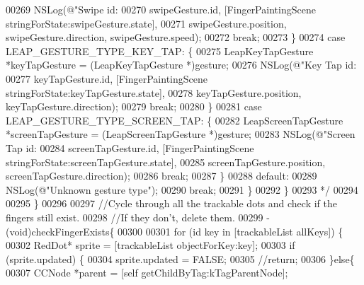 \begin{DoxyCode}
{{{{{{{{{00269 \textcolor{comment}{                NSLog(@"Swipe id: %
00270 \textcolor{comment}{                      swipeGesture.id, [FingerPaintingScene stringForState:swipeGesture.state],}
00271 \textcolor{comment}{                      swipeGesture.position, swipeGesture.direction, swipeGesture.speed);}
00272 \textcolor{comment}{                break;}
00273 \textcolor{comment}{            \}}
00274 \textcolor{comment}{            case LEAP\_GESTURE\_TYPE\_KEY\_TAP: \{}
00275 \textcolor{comment}{                LeapKeyTapGesture *keyTapGesture = (LeapKeyTapGesture *)gesture;}
00276 \textcolor{comment}{                NSLog(@"Key Tap id: %
00277 \textcolor{comment}{                      keyTapGesture.id, [FingerPaintingScene stringForState:keyTapGesture.state],}
00278 \textcolor{comment}{                      keyTapGesture.position, keyTapGesture.direction);}
00279 \textcolor{comment}{                break;}
00280 \textcolor{comment}{            \}}
00281 \textcolor{comment}{            case LEAP\_GESTURE\_TYPE\_SCREEN\_TAP: \{}
00282 \textcolor{comment}{                LeapScreenTapGesture *screenTapGesture = (LeapScreenTapGesture *)gesture;}
00283 \textcolor{comment}{                NSLog(@"Screen Tap id: %
00284 \textcolor{comment}{                      screenTapGesture.id, [FingerPaintingScene stringForState:screenTapGesture.state],}
00285 \textcolor{comment}{                      screenTapGesture.position, screenTapGesture.direction);}
00286 \textcolor{comment}{                break;}
00287 \textcolor{comment}{            \}}
00288 \textcolor{comment}{            default:}
00289 \textcolor{comment}{                NSLog(@"Unknown gesture type");}
00290 \textcolor{comment}{                break;}
00291 \textcolor{comment}{        \}}
00292 \textcolor{comment}{    \}}
00293 \textcolor{comment}{     */}
00294 
00295 \}
00296 
00297 \textcolor{comment}{//Cycle through all the trackable dots and check if the fingers still exist.}
00298 \textcolor{comment}{//If they don't, delete them.}
00299 - (void)checkFingerExists\{
00300     
00301     \textcolor{keywordflow}{for} (\textcolor{keywordtype}{id} key in [trackableList allKeys]) \{
00302         RedDot* sprite = [trackableList objectForKey:key];
00303         \textcolor{keywordflow}{if} (sprite.updated) \{
00304             sprite.updated = FALSE;
00305             \textcolor{comment}{//return;}
00306         \}\textcolor{keywordflow}{else}\{
00307             CCNode *parent = [\textcolor{keyword}{self} getChildByTag:kTagParentNode];
}}}}}}}}}}}}
\end{DoxyCode}
